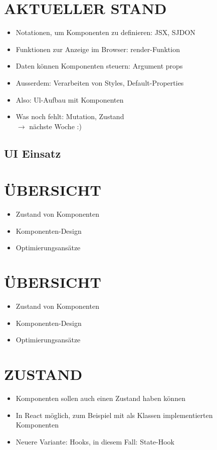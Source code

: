   \section*{AKTUELLER STAND}
  \begin{itemize}
    \item Notationen, um Komponenten zu definieren: JSX, SJDON
    \item Funktionen zur Anzeige im Browser: render-Funktion
    \item Daten können Komponenten steuern: Argument props
    \item Ausserdem: Verarbeiten von Styles, Default-Properties
    \item Also: Ul-Aufbau mit Komponenten
    \item Was noch fehlt: Mutation, Zustand\\
  $\rightarrow$ nächste Woche :)
  \end{itemize}

\subsection{UI Einsatz}

\section*{ÜBERSICHT}
\begin{itemize}
  \item Zustand von Komponenten
  \item Komponenten-Design
  \item Optimierungsansätze
\end{itemize}

\section*{ÜBERSICHT}
\begin{itemize}
  \item Zustand von Komponenten
  \item Komponenten-Design
  \item Optimierungsansätze
\end{itemize}

\section*{ZUSTAND}
\begin{itemize}
  \item Komponenten sollen auch einen Zustand haben können
  \item In React möglich, zum Beispiel mit als Klassen implementierten Komponenten
  \item Neuere Variante: Hooks, in diesem Fall: State-Hook
\end{itemize}


